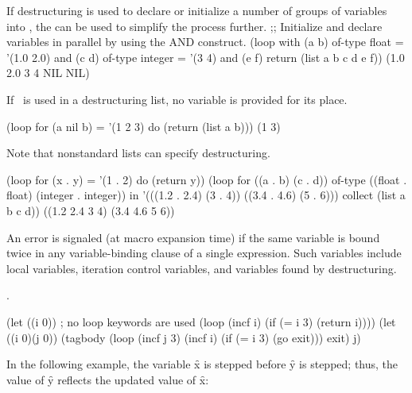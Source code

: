  
 
If destructuring is used to declare or initialize a number of groups
of variables into , the   can be used
to simplify the process further.
\code
;; Initialize and declare variables in parallel by using the AND construct.\kern-7pt
 (loop with (a b) of-type float = '(1.0 2.0)
       and (c d) of-type integer = '(3 4)
       and (e f)
       return (list a b c d e f))
\EV (1.0 2.0 3 4 NIL NIL)
\endcode
{} 
 
 
If \nil\ is used in a destructuring list, no variable is provided for
its place.
 
\code
 (loop for (a nil b) = '(1 2 3)
       do (return (list a b)))
\EV (1 3)
\endcode
 
Note that nonstandard lists can specify destructuring.
 
\code
 (loop for (x . y) = '(1 . 2)
       do (return y))
 (loop for ((a . b) (c . d)) of-type ((float . float) (integer . integer)) in
       '(((1.2 . 2.4) (3 . 4)) ((3.4 . 4.6) (5 . 6)))
       collect (list a b c d))
\EV ((1.2 2.4 3 4) (3.4 4.6 5 6))
\endcode
 
An error  is signaled (at macro expansion time)
if the same variable is bound twice in any variable-binding
clause of a single  expression.  Such variables include
local variables, iteration control variables, and variables found by
destructuring.

\endsubsubsection%


\Seesection\TraversalRules.

\endsubsubsection%

\endsubSection%


\code
 (let ((i 0))                     ; no loop keywords are used
    (loop (incf i) (if (= i 3) (return i)))) 
 (let ((i 0)(j 0))
    (tagbody
      (loop (incf j 3) (incf i) (if (= i 3) (go exit)))
      exit)
    j) 
\endcode


In the following example, the variable \f{x} is stepped
before \f{y} is stepped; thus, the value of \f{y}
reflects the updated value of \f{x}:
 
